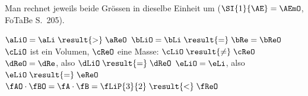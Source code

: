 Man rechnet jeweils beide Grössen in dieselbe Einheit um ($\SI{1}{\AE} = \AEmO$, FoTaBe S.~205).
\begin{abcliste}
\abc $\aLiO = \aLi \;\result{>}\; \aReO$
\abc $\bLiO = \bLi \;\result{=}\; \bRe = \bReO$
\abc $\cLiO$ ist ein Volumen, $\cReO$ eine Masse: $\cLiO \;\result{\neq}\; \cReO$
\abc $\dReO = \dRe$, also $\dLiO \;\result{=}\; \dReO$
\abc $\eLiO = \eLi$, also $\eLiO \;\result{=}\; \eReO$
\abc $\fAO\cdot\fBO = \fA\cdot\fB = \fLiP{3}{2} \;\result{<}\; \fReO$
\end{abcliste}
